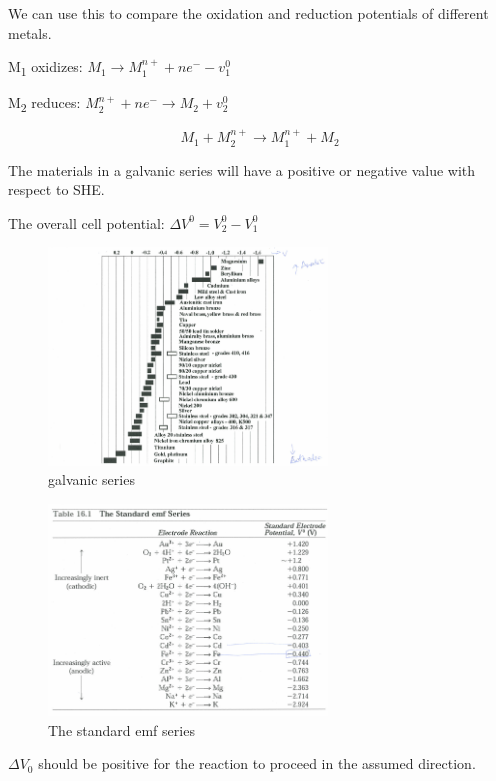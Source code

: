\documentclass{article}
\begin{document}
We can use this to compare the oxidation and reduction potentials of different metals.

M\textsubscript{1} oxidizes: $M_1\rightarrow M_1^{n+}+ne^{-}-v_1^0$

M\textsubscript{2} reduces: $M_2^{n+}+ne^-\rightarrow M_2+v_2^0$

\[M_1+M_2^{n+} \rightarrow M_1^{n+} + M_2\]

The materials in a galvanic series will have a positive or negative value with respect to SHE.

The overall cell potential: $\Delta V^0 = V_2^0 - V_1^0$

\begin{figure}[h!]
	\centering
	\includegraphics[width=0.66\textwidth]{assets/fffedf23.png}
	\caption{galvanic series}
\end{figure}

\begin{figure}[h!]
	\centering
	\includegraphics[width=0.66\textwidth]{assets/0c092313.png}
	\caption{The standard emf series}
	\label{anotherseries}
\end{figure}

$\Delta V_0$ should be positive for the reaction to proceed in the assumed direction.
\end{document}
